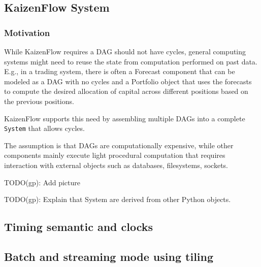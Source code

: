 \documentclass[11pt, reqno]{amsart}
\theoremstyle{definition}
\theoremstyle{remark}
\begin{document}

\subsection{KaizenFlow System}

\subsubsection{Motivation}

While KaizenFlow requires a DAG should not have cycles, general computing
systems might need to reuse the state from computation performed on past data.
E.g., in a trading system, there is often a Forecast component that can be
modeled as a DAG with no cycles and a Portfolio object that uses the forecasts
to compute the desired allocation of capital across different positions based on
the previous positions.

KaizenFlow supports this need by assembling multiple DAGs into a complete
\verb|System| that allows cycles.

The assumption is that DAGs are computationally expensive, while other components mainly execute light procedural computation that requires interaction with external
objects such as databases, filesystems, sockets.

TODO(gp): Add picture

TODO(gp): Explain that System are derived from other Python objects.

\subsection{Timing semantic and clocks}

\subsection{Batch and streaming mode using tiling}

\end{document}
